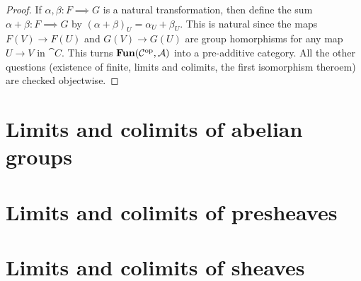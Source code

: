 \documentclass[../main.tex]{subfiles}
\begin{document}
\begin{proof}
	If $\alpha, \beta: F \implies G$ is a natural transformation, then define the sum $\alpha + \beta: F \implies G$ by $(\alpha + \beta)_U = \alpha_U + \beta_U$. This is natural since the maps $F(V) \to F(U)$ and $G(V) \to G(U)$ are group homorphisms for any map $U \to V$ in $\cat C$. This turns $\operatorname{\mathbf{Fun}}(\mathcal{C}^{\mathrm{op}}, \mathcal{A})$ into a pre-additive category. All the other questions (existence of finite, limits and colimits, the first isomorphism theroem) are checked objectwise.
\end{proof}

\section{Limits and colimits of abelian groups}

\section{Limits and colimits of presheaves}

\section{Limits and colimits of sheaves}
\end{document}
